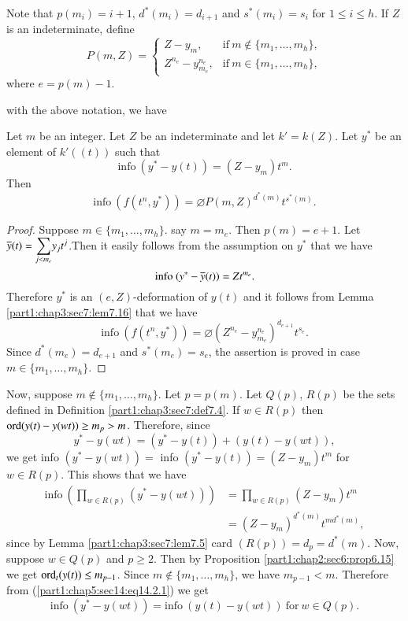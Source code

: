Note that $p(m_i)= i+1$, $d^* (m_i) = d_{i+1}$ and $s^* (m_i) =s_i$
for $1 \leq i \leq h$. If $Z$ is an indeterminate, define
$$
P(m, Z)=
\begin{cases}
  Z- y_m, & \text{if}~ m \notin \{ m_1 , \ldots , m_h \},\\
  Z^{n_e}- y^{n_e}_{m_e}, & \text{if}~ m \in \{ m_1, \ldots , m_h \},
\end{cases}
$$
where $e= p(m)-1$.

with the above notation, we have
\setcounter{thm}{1}
\begin{thm}\label{part1:chap5:sec14:thm14.2}
  Let $m$ be an integer. Let $Z$ be an indeterminate and let $k'
  =k(Z)$. Let $y^*$ be an element of $k'((t))$ such that 
$$
\text{info}~ (y^* - y(t)) = (Z-y_m)t^m.
$$
Then 
$$
\text{info}~ (f(t^n, y^*)) = \diameter P(m, Z)^{d^*(m)} t^{s^*(m)}. 
$$
\end{thm}

\begin{proof}
  Suppose $m \in \{ m_1, \ldots, m_h\}$. say $m=m_e$. Then $p(m)=
  e+1$. Let $\overline{y} (t) = \displaystyle{\sum_{j < m_e}}y_j
  t^j$.\pageoriginale Then it easily follows from the assumption on
  $y^*$ that we have 
$$
\text{info}~ (y^* - \overline{y} (t)) = Z t^{m_e}.
$$ 
Therefore $y^*$ is an $(e, Z)$-deformation of $y(t)$ and it follows
from Lemma \ref{part1:chap3:sec7:lem7.16} that we have
$$
\text{info}~ (f(t^n, y^*)) = \diameter \left(Z^{n_e}- y^{n_e}_{m_e}
\right)^{d_{e+1}} t^{s_e}. 
$$
Since $d^* (m_e)= d_{e+1}$ and $s^* (m_e)= s_e$, the assertion is
proved in case $m \in \{ m_1, \ldots , m_h\}$. 
\end{proof}

Now, suppose $m \notin \{ m_1, \ldots , m_h\}$. Let $p = p(m)$. Let
$Q(p)$, $R(p)$ be the sets defined in Definition
\ref{part1:chap3:sec7:def7.4}. If $w \in R(p)$ then $\operatorname{ord} (y(t)-
y(wt))\geq m_p > m$. Therefore, since
\begin{equation*}
  y^* - y(wt)= (y^* - y(t))+ (y(t)-
  y(wt)),\tag{14.2.1}\label{part1:chap5:sec14:eq14.2.1} 
\end{equation*}
we get info $(y^* - y(wt))=$ info $(y^* - y(t))= (Z- y_m)t^m$ for $w
\in R(p)$. This shows that we have
\begin{align*}
  \text{info}~ \left(\prod_{w \in R(p)} (y^* - y(wt))\right) & =
  \prod_{w \in R(p)} (Z- y_m) t^m\\
  & = (Z- y_m)^{d^*(m)} t^{md^*
    (m)},\tag{14.2.2}\label{part1:chap5:sec14:eq14.2.2}  
\end{align*}
since by Lemma \ref{part1:chap3:sec7:lem7.5} card $(R(p))= d_p = d^*
(m)$. Now, suppose $w \in Q(p)$ and $p \geq 2$. Then by Proposition
\ref{part1:chap2:sec6:prop6.15} we get $\operatorname{ord}_t (y(t))\leq
m_{p-1}$. Since $m \notin \{ m_1, \ldots , m_h \}$, we have $m_{p-1}<
m$. Therefore from (\ref{part1:chap5:sec14:eq14.2.1}) we get 
\begin{equation*}
  \text{info}~ (y^* - y(wt))= \text{info}~ (y(t)- y(wt)) ~\text{for}~
  w \in Q(p).\tag{14.2.3}\label{part1:chap5:sec14:eq14.2.3} 
\end{equation*}

